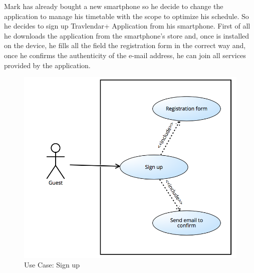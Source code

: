 \documentclass[numbers=noenddot, 12pt, a4paper, oneside]{scrbook}
\begin{document}
Mark has already bought a new smartphone so he decide to change the application to manage his timetable with the scope to optimize his schedule. So he decides to sign up Travlendar+ Application from his smartphone.
First of all he downloads the application from the smartphone’s store and, once is installed on the device, he fills all the field the registration form in the correct way and, once he confirms the authenticity of the e-mail address, he can join all services provided by the application.\\
\begin{figure}[H]
	\includegraphics[width=1\textwidth]{usecases/Scenario1}
	\caption{Use Case: Sign up}
\end{figure}
\end{document}

